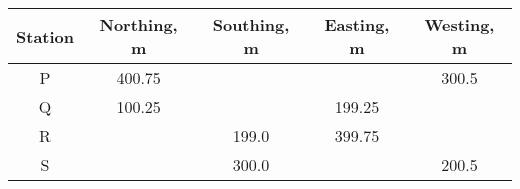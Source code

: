 \begin{center}
	\begin{tabular}{|c|c|c|c|c|}
		\hline
		\textbf{Station} & \textbf{Northing, m} & \textbf{Southing, m} & \textbf{Easting, m} & \textbf{Westing, m} \\ \hline
		P & 400.75 & & & 300.5 \\ \hline
		Q & 100.25 & & 199.25 & \\ \hline
		R & & 199.0 & 399.75 & \\ \hline
		S & & 300.0 & & 200.5 \\ \hline
	\end{tabular}
\end{center}
